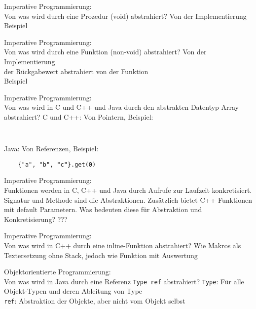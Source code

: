 \begin{card}
	Imperative Programmierung:\\
	Von was wird durch eine Prozedur (void) abstrahiert?
	\hr
	Von der Implementierung\\
	Beispiel
\end{card}

\begin{card}
	Imperative Programmierung:\\
	Von was wird durch eine Funktion (non-void) abstrahiert?
	\hr
	Von der Implementierung\\
	der Rückgabewert abstrahiert von der Funktion\\
	Beispiel
\end{card}

\begin{card}
	Imperative Programmierung:\\
	Von was wird in C und C++ und Java durch den abstrakten Datentyp Array abstrahiert?
	\hr
	C und C++: Von Pointern, Beispiel: \begin{lstlisting}
		
		\end{lstlisting}
	
	Java: Von Referenzen, Beispiel: \begin{lstlisting}
	{"a", "b", "c"}.get(0)
	\end{lstlisting}
	
\end{card}

\begin{card}
	Imperative Programmierung:\\
	Funktionen werden in C, C++ und Java durch Aufrufe zur Laufzeit konkretisiert. Signatur und Methode sind die Abstraktionen. Zusätzlich bietet C++ Funktionen mit default Parametern. Was bedeuten diese für Abstraktion und Konkretisierung?
	\hr
	???
\end{card}

\begin{card}
	Imperative Programmierung:\\
	Von was wird in C++ durch eine inline-Funktion abstrahiert?
	\hr
	Wie Makros als Textersetzung ohne Stack, jedoch wie Funktion mit Auswertung
\end{card}

\begin{card}
	Objektorientierte Programmierung:\\
	Von was wird in Java durch eine Referenz \texttt{Type ref} abstrahiert?
	\hr
	\texttt{Type}: Für alle Objekt-Typen und deren Ableitung von Type\\
	\texttt{ref}: Abstraktion der Objekte, aber nicht vom Objekt selbst
\end{card}

